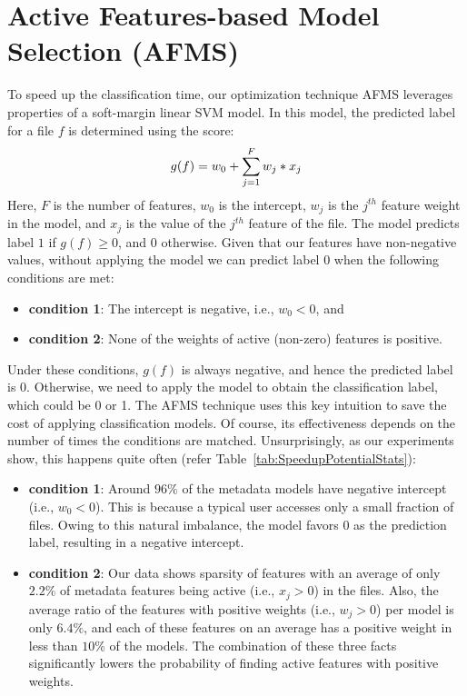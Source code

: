 \section{Active Features-based Model Selection (AFMS)}
\label{sec:testspeedup}
%
To speed up the classification time, our optimization technique AFMS
leverages properties of a soft-margin linear SVM model.  In this
model, the predicted label for a file $f$ is determined using the
score:
%
\vspace{-0.1in}
\begin{equation} 
\vspace{-0.1in}
\label{eq:linearsvmsum}
g(f) = w_0 + \sum_{j=1}^{F}{w_j*x_j}
\end{equation}
%
Here, $F$ is the number of features, $w_0$ is the intercept, $w_j$ 
is the $j^{th}$ feature weight in the model, and $x_j$ is the value of the $j^{th}$
feature of the file. The model predicts label $1$ if $g(f) \ge 0$,
and $0$ otherwise.  Given that our features have non-negative values,
without applying the model we can predict label $0$ when the following
conditions are met:
%
\begin{itemize}
  \renewcommand{\labelitemi}{$\bullet$}
  \item \textbf{condition 1}: The intercept is negative, i.e., $w_0 <
    0$, and
  \item \textbf{condition 2}: None of the weights of active (non-zero)
    features is positive.
\end{itemize}
%
Under these conditions, $g(f)$ is always negative, and hence the predicted label
is $0$.  Otherwise, we need to apply the model to obtain the
classification label, which could be 0 or 1.  The AFMS technique uses
this key intuition to save the cost of applying classification models.
Of course, its effectiveness depends on the number of times the
conditions are matched. Unsurprisingly, as our experiments show, this
happens quite often (refer Table~\ref{tab:SpeedupPotentialStats}):
%
\begin{itemize}
    \renewcommand{\labelitemi}{$\bullet$}
\item \textbf{condition 1}: Around $96\%$ of the metadata models have negative
  intercept (i.e., $w_0 < 0$).  This is because a typical user
  accesses only a small fraction of files.  Owing to this natural
  imbalance, the model favors $0$ as the prediction label, resulting
  in a negative intercept.
\item \textbf{condition 2}: Our data shows sparsity of features
  with an average of only $2.2\%$ of metadata features being active (i.e., $x_j > 0$) in the files.
  Also, the average ratio of the features with positive weights (i.e., $w_j > 0$) per model is only
  $6.4\%$, and each of these features on an average has a positive weight in less
  than $10\%$ of the models.  The combination of these three facts
  significantly lowers the probability of finding active features with positive
  weights.
\end{itemize}

